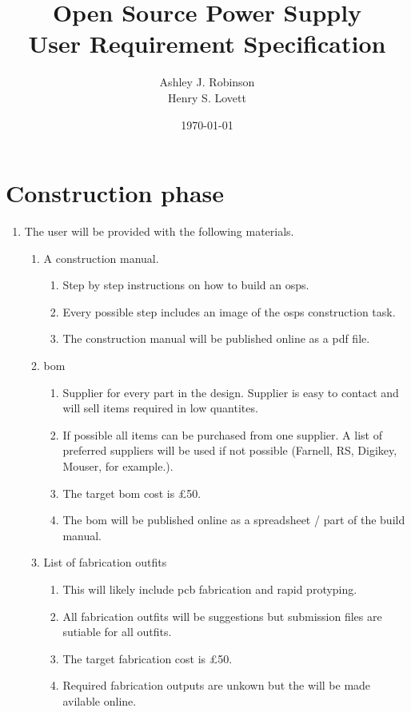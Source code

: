 \documentclass[12pt,a4paper]{article}
\title{Open Source Power Supply\\ User Requirement Specification}
\author{Ashley J. Robinson \\ Henry S. Lovett}
\date{\today}
\begin{document}
\maketitle



\section{Construction phase}
\begin{enumerate}[label*=\arabic*.]
\item The user will be provided with the following materials.
	\begin{enumerate}[label*=\arabic*.]
	\item A construction manual.
		\begin{enumerate}[label*=\arabic*.]
		\item Step by step instructions on how to build an \gls{osps}.
		\item Every possible step includes an image of the \gls{osps} construction task. 
		\item The construction manual will be published online as a pdf file.
		\end{enumerate}
	\item \gls{bom}
		\begin{enumerate}[label*=\arabic*.]
		\item Supplier for every part in the design. Supplier is easy to contact and will sell items required in low quantites.
		\item If possible all items can be purchased from one supplier. A list of preferred suppliers will be used if not possible (Farnell, RS, Digikey, Mouser, for example.).
		\item The target \gls{bom} cost is \pounds50.
		\item The \gls{bom} will be published online as a spreadsheet / part of the build manual.
		\end{enumerate}
	\item List of fabrication outfits
		\begin{enumerate}[label*=\arabic*.]
		\item This will likely include \gls{pcb} fabrication and rapid protyping.
		\item All fabrication outfits will be suggestions but submission files are sutiable for all outfits.
		\item The target fabrication cost is \pounds50.
		\item Required fabrication outputs are unkown but the will be made avilable online.

\end{enumerate}
\end{enumerate}
\end{enumerate}
\end{document}
